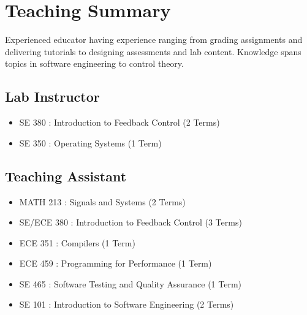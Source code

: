 \documentclass[oneside, 10pt]{memoir}
\begin{document}
\section*{Teaching Summary}
\begin{adjustwidth}{1em}{0em}%
    Experienced educator having experience ranging from grading assignments and delivering tutorials to designing assessments and lab content.
    Knowledge spans topics in software engineering to control theory.
    \subsection*{Lab Instructor}
    \begin{itemize}
        \item{SE 380 : Introduction to Feedback Control (2 Terms)}
        \item{SE 350 : Operating Systems (1 Term)}
    \end{itemize}

    \subsection*{Teaching Assistant}
    \begin{itemize}
        \item{MATH 213 : Signals and Systems (2 Terms)}
        \item{SE/ECE 380 : Introduction to Feedback Control (3 Terms)}
        \item{ECE 351 : Compilers (1 Term)}
        \item{ECE 459 : Programming for Performance (1 Term)}
        \item{SE 465 : Software Testing and Quality Assurance (1 Term)}
        \item{SE 101 : Introduction to Software Engineering (2 Terms)}
    \end{itemize}
\end{adjustwidth}
\end{document}

